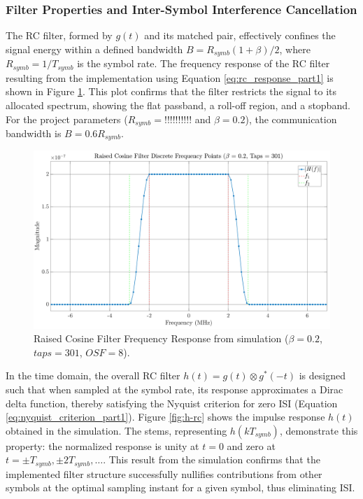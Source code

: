 \subsubsection{Filter Properties and Inter-Symbol Interference Cancellation}
The RC filter, formed by $g(t)$ and its matched pair, effectively confines the signal energy within a defined bandwidth $B = R_{symb} (1+\beta)/2$, where $R_{symb} = 1/T_{symb}$ is the symbol rate. The frequency response of the RC filter resulting from the implementation using Equation \ref{eq:rc_response_part1} is shown in Figure \ref{fig:h-rc-freq}. This plot confirms that the filter restricts the signal to its allocated spectrum, showing the  flat passband, a roll-off region, and a stopband. For the project parameters ($R_{symb} = !!!!!!!!!!$ and $\beta = 0.2$), the communication bandwidth is $B = 0.6 R_{symb}$.

\begin{figure}[H]
	\centering
	\includegraphics[width=0.9\linewidth]{Images/h-rc-freq} 
	\caption{Raised Cosine Filter Frequency Response from simulation ($\beta = 0.2$, $taps = 301$, $OSF = 8$).}
	\label{fig:h-rc-freq}
\end{figure}

In the time domain, the overall RC filter $h(t) = g(t) \otimes g^*(-t)$ is designed such that when sampled at the symbol rate, its response approximates a Dirac delta function, thereby satisfying the Nyquist criterion for zero ISI (Equation \ref{eq:nyquist_criterion_part1}). Figure \ref{fig:h-rc} shows the impulse response $h(t)$ obtained in the simulation. The stems, representing $h(kT_{symb})$, demonstrate this property: the normalized response is unity at $t=0$ and zero at $t = \pm T_{symb}, \pm 2T_{symb}, \dots$. This result from the simulation confirms that the implemented filter structure successfully nullifies contributions from other symbols at the optimal sampling instant for a given symbol, thus eliminating ISI.

